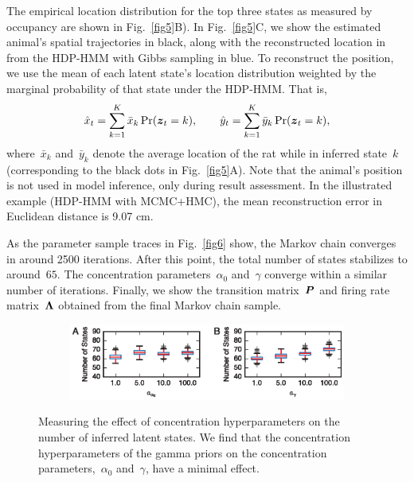 The empirical location distribution for the top three states as
measured by occupancy are shown in Fig.~\ref{fig5}B). In
Fig.~\ref{fig5}C, we show the estimated animal's spatial trajectories
in black, along with the reconstructed location in from the HDP-HMM
with Gibbs sampling in blue. To reconstruct the position, we use the
mean of each latent state's location distribution weighted by the
marginal probability of that state under the HDP-HMM. That is,
\begin{align*}
\hat{x}_t = \sum_{k=1}^K \bar{x}_k \Pr(\boldsymbol{z}_t=k), \qquad
\hat{y}_t = \sum_{k=1}^K  \bar{y}_k \Pr(\boldsymbol{z}_t=k),
\end{align*}
where~$\bar{x}_k$ and~$\bar{y}_k$ denote the average location of the
rat while in inferred state~$k$ (corresponding to the black dots in
Fig.~\ref{fig5}A). Note that the animal's position is not used in
model inference, only during result assessment. In the illustrated
example (HDP-HMM with MCMC+HMC), the mean reconstruction error in
Euclidean distance is 9.07 cm.



As the parameter sample traces in Fig.~\ref{fig6} show, the Markov
chain converges in around 2500 iterations. After this point, the total
number of states stabilizes to around~$65$.  The concentration
parameters~$\alpha_0$ and~$\gamma$ converge within a similar number of
iterations.  Finally, we show the transition matrix~$\boldsymbol{P}$ and firing
rate matrix~$\boldsymbol{\Lambda}$ obtained from the final Markov chain sample.


\begin{figure}[t!]
  \centering
  \begin{subfigure}[t]{5in}
    \includegraphics[width=\textwidth]{figures/ch7/Fig7}
  \end{subfigure}
  \caption[Effect of concentration hyperparameters]{Measuring the
    effect of concentration hyperparameters on the number of inferred
    latent states. We find that the concentration hyperparameters of
    the gamma priors on the concentration parameters,~$\alpha_0$
    and~$\gamma$, have a minimal effect.}
  \label{fig7}
\end{figure}



